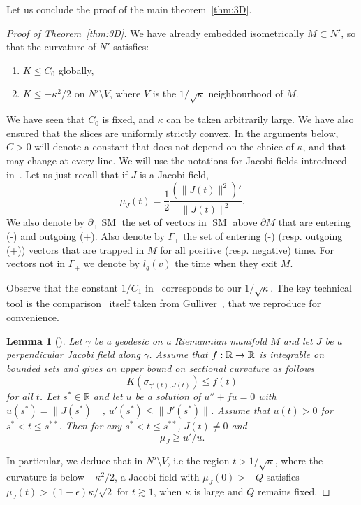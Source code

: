 \documentclass[10pt]{amsart}
\newtheorem{lemm}[theo]{Lemma}\newtheorem{prop}[theo]{Proposition}\newtheorem{coro}[theo]{Corollary}\newtheorem{conj}[theo]{Conjecture}
\theoremstyle{definition}\newtheorem{defi}[theo]{Definition}\newtheorem{rema}[theo]{Remark}\newtheorem{exam}[theo]{Example}\newtheorem{exem}[theo]{Example}\newtheorem{nota}[theo]{Notation}
\newcommand{\R}{\mathbb{R}}
\DeclareMathOperator{\SM}{SM}
\theoremstyle{plain}
\renewcommand*{\to}{\mathchoice{\longrightarrow}{\rightarrow}{\rightarrow}{\rightarrow}}
\begin{document}
Let us conclude the proof of the main theorem~\ref{thm:3D}.
\begin{proof}[Proof of Theorem~\ref{thm:3D}]
We have already embedded isometrically $M\subset N'$, so that the curvature of $N'$ satisfies:
\begin{enumerate}
\item $K \leq C_0$ globally,
\item $K \leq - \kappa^2 /2$ on $N'\setminus V$, where $V$ is the $1/\sqrt{\kappa}$ neighbourhood of $M$.
\end{enumerate}
We have seen that $C_0$ is fixed, and $\kappa$ can be taken arbitrarily large. We have also ensured that the slices are uniformly strictly convex. In the arguments below, $C>0$ will denote a constant that does not depend on the choice of $\kappa$, and that may change at every line. We will use the notations for Jacobi fields introduced in~\cite{Chen-Erchenko-Gogolev}. Let us just recall that if $J$ is a Jacobi field,
\[
\mu_J(t) = \frac{1}{2}\frac{(\| J(t) \|^2)'}{\|J(t)\|^2}.
\]
We also denote by $\partial_{\pm} \SM$ the set of vectors in $\SM$ above $\partial M$ that are entering (-) and outgoing (+). Also denote by $\Gamma_{\pm}$ the set of entering (-) (resp. outgoing (+)) vectors that are trapped in $M$ for all positive (resp. negative) time. For vectors not in $\Gamma_+$ we denote by $l_g(v)$ the time when they exit $M$.

Observe that the constant $1/C_1$ in~\cite{Chen-Erchenko-Gogolev} corresponds to our $1/\sqrt{\kappa}$. The key technical tool is the comparison~\cite[Lemma~2.8]{Chen-Erchenko-Gogolev} itself taken from Gulliver~\cite[Lemma~3]{Gulliver-75}, that we reproduce for convenience.

\begin{lemm}[{\cite[Lemma~3]{Gulliver-75}}]
Let $\gamma$ be a geodesic on a Riemannian manifold $M$ and let $J$ be a perpendicular Jacobi field along $\gamma$. Assume that $f:\R\to\R$ is integrable on bounded sets and gives an upper bound on sectional curvature as follows
\[
K\left(\sigma_{\gamma'(t), J(t)}\right) \leq f (t)
\]
for all $t$. Let $s^\ast\in\R$ and let $u$ be a solution of $u''+f u = 0$ with $u(s^\ast)= \|J(s^\ast)\|$, $u'(s^\ast)\leq \|J'(s^\ast)\|$. Assume that $u(t)>0$ for $s^\ast < t \leq s^{\ast\ast}$. Then for any $s^\ast < t \leq s^{\ast\ast}$, $J(t)\neq 0$ and
\[
\mu_J \geq u' / u.
\]
\end{lemm}

In particular, we deduce that in $N'\setminus V$, i.e the region $t>1/\sqrt{\kappa}$, where the curvature is below $-\kappa^2/2$, a Jacobi field with $\mu_J(0)> - Q$ satisfies $\mu_J(t)>(1-\epsilon)\kappa/\sqrt{2}$ for $t\gtrsim 1$, when $\kappa$ is large and $Q$ remains fixed.


\end{proof}
\end{document}
